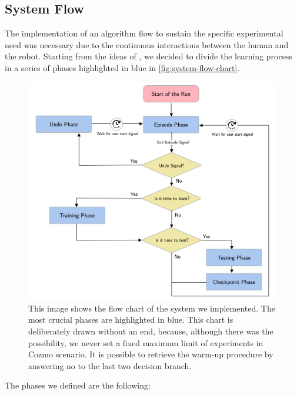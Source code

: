\subsection{System Flow} \label{subsec:system-flow}

The implementation of an algorithm flow to sustain the specific experimental need was necessary due to the continuous interactions between the human and the robot.
Starting from the ideas of \cite{kendall2018learning,kendall2019learning}, we decided to divide the learning process in a series of phases highlighted in blue in \vref{fig:system-flow-chart}.

\begin{figure}
    \centering
    \includegraphics[width=\textwidth]{img/system-flow.png}
    \caption[Cozmo algorithm flow chart]{This image shows the flow chart of the system we implemented.
        The most crucial phases are highlighted in blue.
        This chart is deliberately drawn without an end, because, although there was the possibility, we never set a fixed maximum limit of experiments in Cozmo scenario.
        It is possible to retrieve the warm-up procedure by answering no to the last two decision branch.}
    \label{fig:system-flow-chart}
\end{figure}

The phases we defined are the following:

